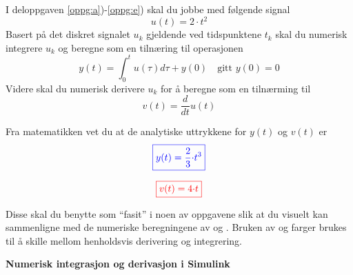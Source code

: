 
\item[] I deloppgaven \ref{oppg:a})-\ref{oppg:e}) skal du jobbe med følgende signal
\begin{equation}
  \label{eq:u}
 \boxed{ u(t) = 2 {\cdot} t^{2} }
\end{equation}
Basert på det diskret signalet $u_{k}$ gjeldende ved
tidspunktene  $t_{k}$ skal 
du numerisk integrere $u_{k}$ og beregne
{\color{blue}}  
som en tilnæring til operasjonen
\begin{equation}
  y(t)=\int_{0}^{t}u(\tau)d\tau + y(0) \quad \text{gitt } y(0){=}0   \label{eq:y}
\end{equation}
Videre  skal du numerisk derivere  $u_{k}$ for å beregne
{\color{red}} som en tilnærming til
\begin{equation}
  \label{eq:v}
  v(t) = \frac{d}{dt}u(t)
\end{equation}

Fra matematikken vet du at de analytiske uttrykkene for $y(t)$ og
$v(t)$ er
\begin{equation}
  \label{eq:9}
  {\color{blue}\boxed{y(t) = \frac{2}{3} {\cdot}t^{3}} }
\end{equation}

\begin{equation}
          {\color{red}\boxed{v(t) = 4{\cdot}t}}   \label{eq:9a}
\end{equation}

Disse skal du benytte som ``fasit'' i noen av oppgavene
slik at du visuelt kan sammenligne  med de numeriske beregningene av  
{\color{red}} og {\color{blue}}.
Bruken av {\color{red}} og {\color{blue}} farger
brukes til å skille mellom henholdsvis derivering og integrering.

\newpage


\item
  {\bf Numerisk integrasjon og derivasjon i Simulink}
\label{oppg:a}

